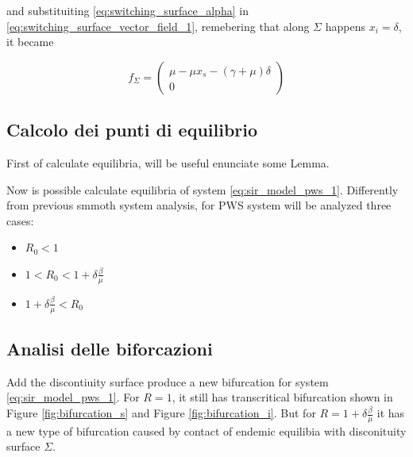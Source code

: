 and substituiting \ref{eq:switching_surface_alpha} in \ref{eq:switching_surface_vector_field_1}, remebering that along $\Sigma$ happens $x_i = \delta$,  it became

\begin{equation}
    \label{eq:switching_surface_vector_field_2}
    f_\Sigma = \begin{pmatrix} \mu - \mu x_s - (\gamma +\mu) \delta \\ 0 \end{pmatrix}
\end{equation}

\subsection{Calcolo dei punti di equilibrio}

First of calculate equilibria, will be useful enunciate some Lemma.





Now is possible calculate equilibria of system \ref{eq:sir_model_pws_1}. Differently from previous smmoth system analysis, for PWS system will be analyzed three cases:
\begin{itemize}
    \item $R_0 < 1$
    \item $1 < R_0 < 1+\delta\frac{\beta}{\mu}$
    \item $1+\delta\frac{\beta}{\mu} < R_0$
\end{itemize}







\subsection{Analisi delle biforcazioni}
Add the discontiuity surface produce a new bifurcation for system \ref{eq:sir_model_pws_1}.
For $R = 1$, it still has transcritical bifurcation shown in Figure \ref{fig:bifurcation_s} and Figure \ref{fig:bifurcation_i}.
But for $ R = 1+\delta\frac{\beta}{\mu}$ it has a new type of bifurcation caused by contact of endemic equilibia with disconituity surface $\Sigma$.



